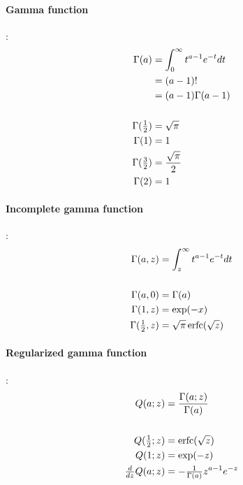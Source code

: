 

\clearpage
\label{sec:math}


\paragraph*{Gamma function}\hspace{-0.8em}\cite{Abramowitz1965}:
\begin{align*}
\Gamma(a) &= \int_0^{\infty} t^{a-1} e^{-t} dt 		 \\
& =(a-1)!									
\\ & = (a-1) \Gamma(a-1)						
\\
\\
\Gamma(\tfrac{1}{2}) &= \sqrt{\pi}				 \\
\Gamma(1) &= 1 							 \\
\Gamma(\tfrac{3}{2})&= \frac{ \sqrt{\pi} }{2}  		  \\
\Gamma(2) & =1 							
\end{align*}


\paragraph*{Incomplete gamma function}\hspace{-0.8em}\cite{Abramowitz1965}:%
 \begin{align*} 
\Gamma(a,z) &= \int_z^{\infty} t^{a-1} e^{-t} dt				
\\
\\
 \Gamma(a,0)&=\Gamma(a)  							 \\
\Gamma(1,z)&=\exp(-x) 									\\
 \Gamma(\tfrac{1}{2},z)&=\sqrt{\pi}\operatorname{erfc}(\sqrt{z}) 		
 \end{align*}
 
\paragraph*{Regularized gamma function}\hspace{-0.8em}\cite{Abramowitz1965}:%
 \begin{align*} 
Q(a;z)& = \frac{\Gamma(a;z) }{\Gamma(a)} 				
\\
\\
Q(\tfrac{1}{2}; z) &= \operatorname{erfc}(\sqrt{z})					
\\
Q(1;z) &= \exp(-z)									
\\
\tfrac{d}{dz} Q(a;z) &= -\tfrac{1}{\Gamma(a)} z^{a-1} e^{-z} 	
\end{align*}



